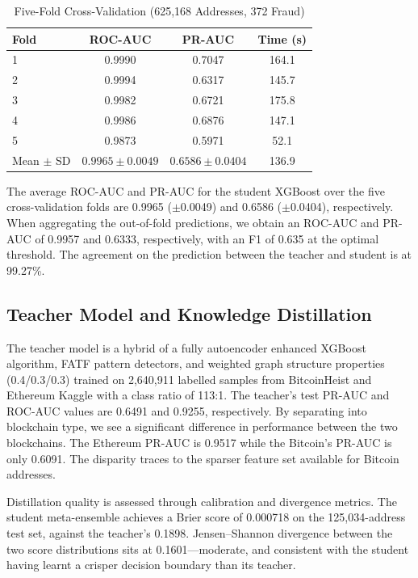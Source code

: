\documentclass[journal]{IEEEtran}
\begin{document}
\begin{table}[!t]
\centering
\caption{Five-Fold Cross-Validation (625,168 Addresses, 372 Fraud)}
\label{tab:cv}
\begin{tabular}{lccc}
\toprule
\textbf{Fold} & \textbf{ROC-AUC} & \textbf{PR-AUC} & \textbf{Time (s)} \\
\midrule
1 & 0.9990 & 0.7047 & 164.1 \\
2 & 0.9994 & 0.6317 & 145.7 \\
3 & 0.9982 & 0.6721 & 175.8 \\
4 & 0.9986 & 0.6876 & 147.1 \\
5 & 0.9873 & 0.5971 & 52.1 \\
\midrule
Mean $\pm$ SD & $0.9965 \pm 0.0049$ & $0.6586 \pm 0.0404$ & 136.9 \\
\bottomrule
\end{tabular}
\end{table}

The average ROC-AUC and PR-AUC for the student XGBoost over the five cross-validation folds are 0.9965 ($\pm$0.0049) and 0.6586 ($\pm$0.0404), respectively. When aggregating the out-of-fold predictions, we obtain an ROC-AUC and PR-AUC of 0.9957 and 0.6333, respectively, with an F1 of 0.635 at the optimal threshold. The agreement on the prediction between the teacher and student is at 99.27\%.

\subsection{Teacher Model and Knowledge Distillation}

The teacher model is a hybrid of a fully autoencoder enhanced XGBoost algorithm, FATF pattern detectors, and weighted graph structure properties (0.4/0.3/0.3) trained on 2,640,911 labelled samples from BitcoinHeist and Ethereum Kaggle with a class ratio of 113:1. The teacher's test PR-AUC and ROC-AUC values are 0.6491 and 0.9255, respectively. By separating into blockchain type, we see a significant difference in performance between the two blockchains. The Ethereum PR-AUC is 0.9517 while the Bitcoin's PR-AUC is only 0.6091. The disparity traces to the sparser feature set available for Bitcoin addresses.

Distillation quality is assessed through calibration and divergence metrics. The student meta-ensemble achieves a Brier score of 0.000718 on the 125,034-address test set, against the teacher's 0.1898. Jensen--Shannon divergence between the two score distributions sits at 0.1601---moderate, and consistent with the student having learnt a crisper decision boundary than its teacher.
\end{document}
